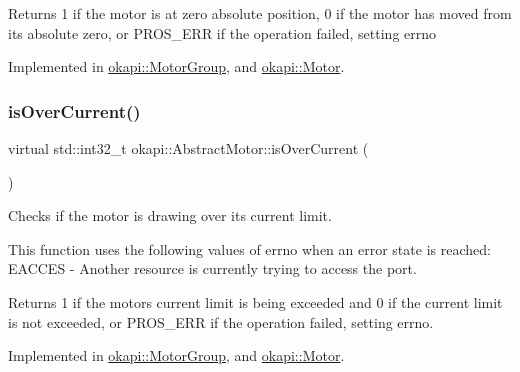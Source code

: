 \begin{DoxyReturn}{Returns}
1 if the motor is at zero absolute position, 0 if the motor has moved from its absolute zero, or P\+R\+O\+S\+\_\+\+E\+RR if the operation failed, setting errno 
\end{DoxyReturn}


Implemented in \mbox{\hyperlink{classokapi_1_1MotorGroup_a94be8c4591e65b268dd4f7357fdf4b50}{okapi\+::\+Motor\+Group}}, and \mbox{\hyperlink{classokapi_1_1Motor_a2640dea57e59a19aa6000da2c7cefdeb}{okapi\+::\+Motor}}.

\mbox{\label{classokapi_1_1AbstractMotor_a3d365496ebb8566c0a12611f090c5231}} 
\subsubsection{\texorpdfstring{isOverCurrent()}{isOverCurrent()}}
{\footnotesize\ttfamily virtual std\+::int32\+\_\+t okapi\+::\+Abstract\+Motor\+::is\+Over\+Current (\begin{DoxyParamCaption}{ }\end{DoxyParamCaption})\hspace{0.3cm}{\ttfamily [pure virtual]}}

Checks if the motor is drawing over its current limit.

This function uses the following values of errno when an error state is reached\+: E\+A\+C\+C\+ES -\/ Another resource is currently trying to access the port.

\begin{DoxyReturn}{Returns}
1 if the motor\textquotesingle{}s current limit is being exceeded and 0 if the current limit is not exceeded, or P\+R\+O\+S\+\_\+\+E\+RR if the operation failed, setting errno. 
\end{DoxyReturn}


Implemented in \mbox{\hyperlink{classokapi_1_1MotorGroup_ab714cb81d252599ab2933e13cc8af40d}{okapi\+::\+Motor\+Group}}, and \mbox{\hyperlink{classokapi_1_1Motor_aff882cb26c477355551d7bbf8e5c03bb}{okapi\+::\+Motor}}.

\mbox{\label{classokapi_1_1AbstractMotor_a61e24db43d1fe790b173cc0b4e27922f}} 
